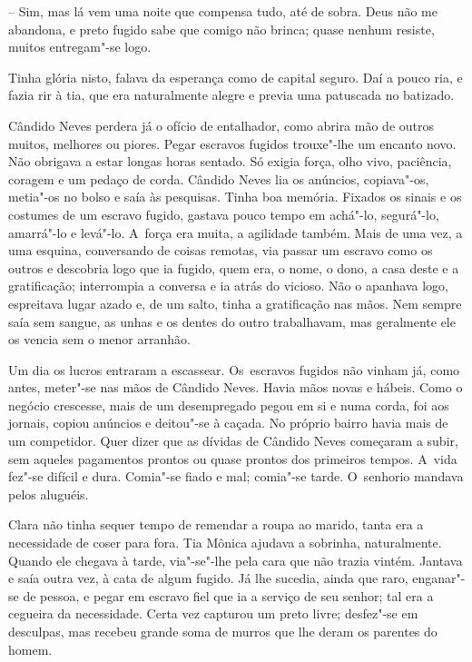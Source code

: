 -- Sim, mas lá vem uma noite que compensa tudo, até de sobra. Deus não
me abandona, e preto fugido sabe que comigo não brinca; quase nenhum
resiste, muitos entregam"-se logo.

Tinha glória nisto, falava da esperança como de capital seguro. Daí a
pouco ria, e fazia rir à tia, que era naturalmente alegre e previa uma
patuscada no batizado.

Cândido Neves perdera já o ofício de entalhador, como abrira mão de
outros muitos, melhores ou piores. Pegar escravos fugidos trouxe"-lhe um
encanto novo. Não obrigava a estar longas horas sentado. Só exigia
força, olho vivo, paciência, coragem e um pedaço de corda. Cândido Neves
lia os anúncios, copiava"-os, metia"-os no bolso e saía às pesquisas.
Tinha boa memória. Fixados os sinais e os costumes de um escravo fugido,
gastava pouco tempo em achá"-lo, segurá"-lo, amarrá"-lo e levá"-lo. A~força
era muita, a agilidade também. Mais de uma vez, a uma esquina,
conversando de coisas remotas, via passar um escravo como os outros e
descobria logo que ia fugido, quem era, o nome, o dono, a casa deste e a
gratificação; interrompia a conversa e ia atrás do vicioso. Não o
apanhava logo, espreitava lugar azado e, de um salto, tinha a
gratificação nas mãos. Nem sempre saía sem sangue, as unhas e os dentes
do outro trabalhavam, mas geralmente ele os vencia sem o menor arranhão.

Um dia os lucros entraram a escassear. Os~escravos fugidos não vinham
já, como antes, meter"-se nas mãos de Cândido Neves. Havia mãos novas e
hábeis. Como o negócio crescesse, mais de um desempregado pegou em si e
numa corda, foi aos jornais, copiou anúncios e deitou"-se à caçada. No
próprio bairro havia mais de um competidor. Quer dizer que as dívidas de
Cândido Neves começaram a subir, sem aqueles pagamentos prontos ou quase
prontos dos primeiros tempos. A~vida fez"-se difícil e dura. Comia"-se
fiado e mal; comia"-se tarde. O~senhorio mandava pelos aluguéis.

Clara não tinha sequer tempo de remendar a roupa ao marido, tanta era a
necessidade de coser para fora. Tia Mônica ajudava a sobrinha,
naturalmente. Quando ele chegava à tarde, via"-se"-lhe pela cara que não
trazia vintém. Jantava e saía outra vez, à cata de algum fugido. Já lhe
sucedia, ainda que raro, enganar"-se de pessoa, e pegar em escravo fiel
que ia a serviço de seu senhor; tal era a cegueira da necessidade. Certa
vez capturou um preto livre; desfez"-se em desculpas, mas recebeu grande
soma de murros que lhe deram os parentes do homem.

